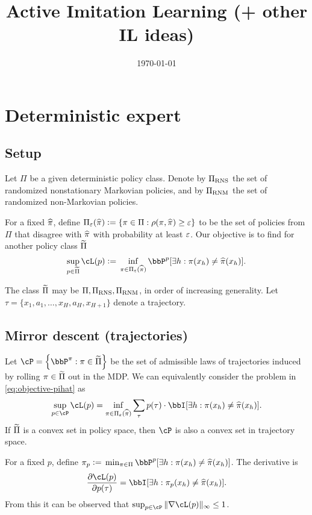 \documentclass{article}
\title{Active Imitation Learning (+ other IL ideas)}
\author{}
\date{\today}
\begin{document}
\maketitle

\tableofcontents

\section{Deterministic expert}

\subsection{Setup} 

Let $\Pi$ be a given deterministic policy class. Denote by $\Pi_{\mathrm{RNS}}$ the set of randomized nonstationary Markovian policies, and 
by $\Pi_{\mathrm{RNM}}$ the set of randomized non-Markovian policies. 

For a fixed $\widehat{\pi}$, define $\Pi_\varepsilon(\widehat{\pi}) \vcentcolon={} \{\pi\in\Pi : \rho(\pi,\widehat{\pi}) \ge \varepsilon\}$ to be the set of policies from $\Pi$ that disagree with $\widehat{\pi}$ with probability at least $\varepsilon$.  
Our objective is to find for another policy class $\widetilde\Pi$ 
\begin{align}
  \label{eq:objective-pihat}
    \sup_{p \in \wt\Pi}{} \cL(p) 
    \ldef{} 
    \inf_{\pi\in\Pi_\veps(\pihat)}{}\bbP^p\sbr*{\exists h : \pi(x_h) \neq \pihat(x_h)}.
\end{align}

The class $\widetilde\Pi$ may be $\Pi,\Pi_{\mathrm{RNS}}, \Pi_{\mathrm{RNM}}$, in order of increasing generality. 
Let $\tau = \{x_1,a_1,\ldots,x_H, a_H, x_{H+1}\}$ denote a trajectory. 


\subsection{Mirror descent (trajectories)} 
Let $\cP = \cbr*{\bbP^\pi : \pi\in\wt\Pi}$ be the set of admissible laws of trajectories induced by rolling $\pi\in\widetilde\Pi$ out in the MDP. We can equivalently consider the problem in \cref{eq:objective-pihat} as 
\begin{align*}
  \sup_{p\in\cP} \cL(p) = \inf_{\pi\in\Pi_\veps(\pihat)} \sum_\tau p(\tau) \cdot \bbI\sbr*{\exists h : \pi(x_h)\neq \pihat(x_h)}.
\end{align*} 
If $\widetilde\Pi$ is a convex set in policy space, then $\cP$ is also a convex set in trajectory space. 

For a fixed $p$, define $\pi_p \ldef{} \min_{\pi\in\Pi} \bbP^p\sbr*{\exists h : \pi(x_h) \neq \pihat(x_h)}$. 
The derivative is 
\begin{align*}
  \frac{\partial \cL(p)}{\partial p(\tau)} = \bbI\sbr*{\exists h : \pi_p(x_h) \neq \pihat(x_h)}. 
\end{align*}
From this it can be observed that $\sup_{p\in\cP}\|\nabla\cL(p)\|_\infty \le 1$. 
\end{document}
